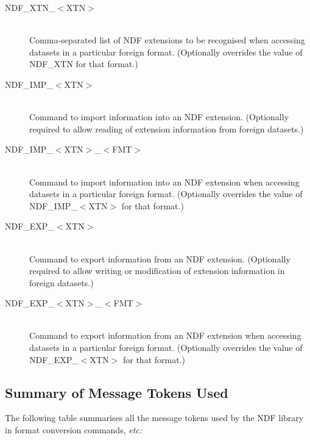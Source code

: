 \documentclass[11pt,twoside,nolof]{starlink}
\providecommand{\st}[1]{{\em{#1}}}
\begin{document}
\begin{description}
\item[NDF\_XTN\_$<$XTN$>$]\mbox{}\\
Comma-separated list of NDF extensions to be recognised when accessing
datasets in a particular foreign format. (Optionally overrides the
value of NDF\_XTN for that format.)

\item[NDF\_IMP\_$<$XTN$>$]\mbox{}\\
Command to import information into an NDF extension. (Optionally
required to allow reading of extension information from foreign
datasets.)

\item[NDF\_IMP\_$<$XTN$>$\_$<$FMT$>$]\mbox{}\\
Command to import information into an NDF extension when accessing
datasets in a particular foreign format. (Optionally overrides the
value of NDF\_IMP\_$<$XTN$>$ for that format.)

\item[NDF\_EXP\_$<$XTN$>$]\mbox{}\\
Command to export information from an NDF extension. (Optionally
required to allow writing or modification of extension information in
foreign datasets.)

\item[NDF\_EXP\_$<$XTN$>$\_$<$FMT$>$]\mbox{}\\
Command to export information from an NDF extension when accessing
datasets in a particular foreign format. (Optionally overrides the
value of NDF\_EXP\_$<$XTN$>$ for that format.)

\end{description}

\subsection{Summary of Message Tokens Used}

The following table summarises all the message tokens used by the NDF
library in format conversion commands, \st{etc:}
\end{document}
